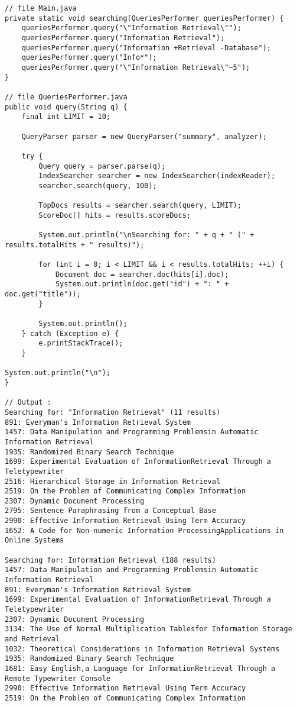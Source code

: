 \documentclass[11pt,a4paper,twoside,svgnames]{article}
\begin{document}
	\begin{lstlisting}
// file Main.java
private static void searching(QueriesPerformer queriesPerformer) {
	queriesPerformer.query("\"Information Retrieval\"");
	queriesPerformer.query("Information Retrieval");
	queriesPerformer.query("Information +Retrieval -Database");
	queriesPerformer.query("Info*");
	queriesPerformer.query("\"Information Retrieval\"~5");
}

// file QueriesPerformer.java
public void query(String q) {
	final int LIMIT = 10;
	
	QueryParser parser = new QueryParser("summary", analyzer);
	
	try {
		Query query = parser.parse(q);
		IndexSearcher searcher = new IndexSearcher(indexReader);
		searcher.search(query, 100);
		
		TopDocs results = searcher.search(query, LIMIT);
		ScoreDoc[] hits = results.scoreDocs;
		
		System.out.println("\nSearching for: " + q + " (" + results.totalHits + " results)");
		
		for (int i = 0; i < LIMIT && i < results.totalHits; ++i) {
			Document doc = searcher.doc(hits[i].doc);
			System.out.println(doc.get("id") + ": " + doc.get("title"));
		}
		
		System.out.println();
	} catch (Exception e) {
		e.printStackTrace();
	}

System.out.println("\n");
}

// Output :
Searching for: "Information Retrieval" (11 results)
891: Everyman's Information Retrieval System
1457: Data Manipulation and Programming Problemsin Automatic Information Retrieval
1935: Randomized Binary Search Technique
1699: Experimental Evaluation of InformationRetrieval Through a Teletypewriter
2516: Hierarchical Storage in Information Retrieval
2519: On the Problem of Communicating Complex Information
2307: Dynamic Document Processing
2795: Sentence Paraphrasing from a Conceptual Base
2990: Effective Information Retrieval Using Term Accuracy
1652: A Code for Non-numeric Information ProcessingApplications in Online Systems

Searching for: Information Retrieval (188 results)
1457: Data Manipulation and Programming Problemsin Automatic Information Retrieval
891: Everyman's Information Retrieval System
1699: Experimental Evaluation of InformationRetrieval Through a Teletypewriter
2307: Dynamic Document Processing
3134: The Use of Normal Multiplication Tablesfor Information Storage and Retrieval
1032: Theoretical Considerations in Information Retrieval Systems
1935: Randomized Binary Search Technique
1681: Easy English,a Language for InformationRetrieval Through a Remote Typewriter Console
2990: Effective Information Retrieval Using Term Accuracy
2519: On the Problem of Communicating Complex Information


\end{lstlisting}
\end{document}
